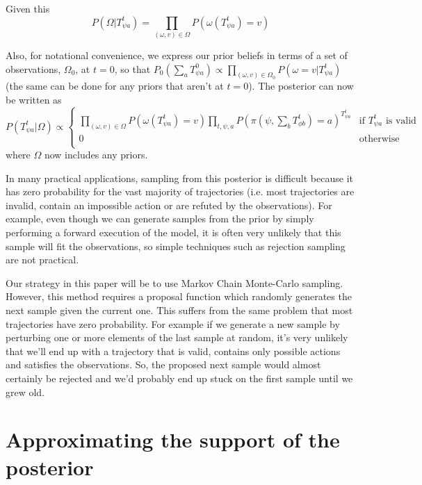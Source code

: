 \documentclass{article}
\begin{document}
Given this
\[
P(\Omega|T^t_{\psi a}) = \prod_{(\omega,v) \in \Omega} P(\omega(T^t_{\psi a})=v)
\]

Also, for notational convenience, we express our prior beliefs in terms of a set of observations, $\Omega_0$, at $t=0$, so that $P_0(\sum_a T^0_{\psi a}) \propto \prod_{(\omega,v) \in \Omega_0} P(\omega=v|T^t_{\psi a})$ (the same can be done for any priors that aren't at $t=0$). The posterior can now be written as
\begin{equation}
P(T^t_{\psi a}|\Omega) \propto 
\begin{cases}
\prod_{(\omega,v) \in \Omega} P\left(\omega(T^{t}_{\psi a})=v\right) \prod_{t, \psi, a}P(\pi(\psi,\sum_bT^{t}_{\phi b})=a)^{T^{t}_{\psi a}} & \text{if } T^t_{\psi a} \text{ is valid} \\
0 & \text{otherwise}\\
\end{cases}
\label{posterior}
\end{equation}
where $\Omega$ now includes any priors.

In many practical applications, sampling from this posterior is difficult because it has zero probability for the vast majority of trajectories (i.e. most trajectories are invalid, contain an impossible action or are refuted by the observations). For example, even though we can generate samples from the prior by simply performing a forward execution of the model, it is often very unlikely that this sample will fit the observations, so simple techniques such as rejection sampling are not practical.

Our strategy in this paper will be to use Markov Chain Monte-Carlo sampling. However, this method requires a proposal function which randomly generates the next sample given the current one. This suffers from the same problem that most trajectories have zero probability. For example if we generate a new sample by perturbing one or more elements of the last sample at random, it's very unlikely that we'll end up with a trajectory that is valid, contains only possible actions and satisfies the observations. So, the proposed next sample would almost certainly be rejected and we'd probably end up stuck on the first sample until we grew old.

\section{Approximating the support of the posterior}
\end{document}
